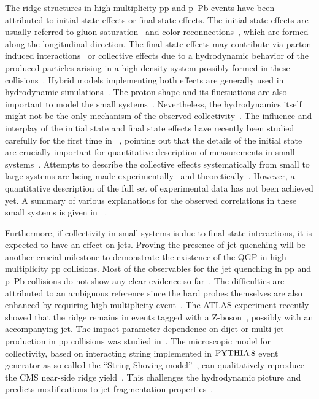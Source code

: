 The ridge structures in high-multiplicity pp and p--Pb events have been attributed to initial-state effects or final-state effects. The initial-state effects are usually referred to gluon saturation~\cite{Dusling:2012cg,Bzdak:2013zma} and color reconnections~\cite{Ortiz:2013yxa,Sarma:2019teo}, which are formed along the longitudinal direction. The final-state effects may contribute via parton-induced interactions~\cite{Arbuzov:2011yr} or collective effects due to a hydrodynamic behavior of the produced particles arising in a high-density system possibly formed in these collisions~\cite{Weller:2017tsr,Zhao:2017rgg}. 
Hybrid models implementing both effects are generally used in hydrodynamic simulations~\cite{Greif:2017bnr,Mantysaari:2017cni}. 
The proton shape and its fluctuations are also important to model the small systems~\cite{Mantysaari:2017cni}.
Nevertheless, the hydrodynamics itself might not be the only mechanism of the observed collectivity~\cite{Zhao:2020pty}. 
The influence and interplay of the initial state and final state effects have recently been studied carefully for the first time in ~\cite{Greif:2019ygb}, pointing out that the details of the initial state are crucially important for quantitative description of measurements in small systems~\cite{Schenke:2019pmk}. 
Attempts to describe the collective effects systematically from small to large systems are being made experimentally~\cite{Acharya:2019vdf} and theoretically~\cite{Greif:2019ygb}.
However, a quantitative description of the full set of experimental data has not been achieved yet.
A summary of various explanations for the observed correlations in these small systems is given in ~\cite{Strickland:2018exs,Loizides:2016tew,Nagle:2018nvi}.

Furthermore, if collectivity in small systems is due to final-state interactions, it is expected to have an effect on jets. Proving the presence of jet quenching will be another crucial milestone to demonstrate the existence of the QGP in high-multiplicity pp collisions. Most of the observables for the jet quenching in pp and p--Pb collisions do not show any clear evidence so far~\cite{Khachatryan:2016odn,Adam:2016jfp,Adam:2016dau,Acharya:2017okq}. The difficulties are attributed to an ambiguous reference since the hard probes themselves are also enhanced by requiring high-multiplicity event~\cite{Adam:2016jfp,Acharya:2018egz}.
The ATLAS experiment recently showed that the ridge remains in events tagged with a Z-boson~\cite{Aaboud:2019mcw}, possibly with an accompanying jet.
The impact parameter dependence on dijet or multi-jet production in pp collisions was studied in~\cite{Frankfurt:2003td,Frankfurt:2010ea}.
The microscopic model for collectivity, based on interacting string implemented in $\mathrm{PYTHIA}\,8$ event generator as so-called the ``String Shoving model''~\cite{Bierlich:2017vhg}, can qualitatively reproduce the CMS near-side ridge yield~\cite{Khachatryan:2016txc}. This challenges the hydrodynamic picture and predicts modifications to jet fragmentation
properties~\cite{Bierlich:2019ixq}.

